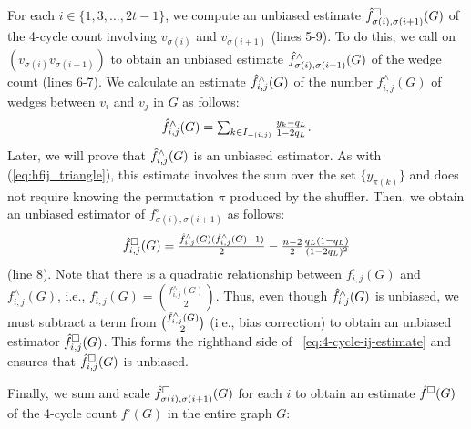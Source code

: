 For each $i \in \{1, 3, \ldots, 2t-1\}$, we compute an unbiased estimate $\hat{f}_{\sigma(i),
\sigma(i+1)}^\square(G)$ of the 4-cycle count involving $v_{\sigma(i)}$ and $v_{\sigma(i+1)}$ (lines 5-9). 
To do this, 
we call \AlgWS{} on
$(v_{\sigma(i)} v_{\sigma(i+1)})$ to obtain an unbiased estimate $\hat{f}_{\sigma(i),
\sigma(i+1)}^\wedge(G)$ of the wedge count (lines 6-7). 
We calculate an estimate $\hat{f}_{i,j}^\wedge(G)$ of the number $f_{i,j}^\wedge(G)$ of wedges between $v_i$ and $v_j$ in $G$ as follows:
\begin{equation}\label{eq:wedge-estimate}
  \textstyle{\hat{f}^\wedge_{i,j}(G) = \sum_{k \in I_{-(i,j)}} \frac{y_k - q_L}{1-2q_L}.}
\end{equation}
Later, we will prove that $\hat{f}^\wedge_{i,j}(G)$ is an unbiased estimator. 
As with (\ref{eq:hfij_triangle}), this estimate involves the sum over the set $\{y_{\pi(k)}\}$ and does not require knowing the permutation $\pi$ produced by the shuffler. 
Then, we obtain an unbiased estimator of $f_{\sigma(i), \sigma(i+1)}^\square$ as follows:
\begin{equation}\label{eq:4-cycle-ij-estimate}
  \textstyle{\hat{f}_{i,j}^\square(G) = \frac{\hat{f}^\wedge_{i, j}(G)(\hat{f}^\wedge_{i, j}(G)-1)}{2} - \frac{n-2}{2}\frac{q_L(1-q_L)}{(1-2q_L)^2}}
\end{equation}
(line 8). 
Note that 
there is a quadratic relationship between $f_{i, j}^\square(G)$ and $f_{i, j}^\wedge(G)$, i.e., $f_{i, j}^\square(G) = \binom{f_{i, j}^\wedge(G)}{2}$. 
Thus, 
even though $\hat{f}_{i, j}^\wedge(G)$ is unbiased, 
we must subtract a term from $\binom{\hat{f}_{i, j}^\wedge(G)}{2}$ (i.e., bias correction) to obtain an unbiased estimator $\hat{f}_{i, j}^\square(G)$. 
This forms the righthand side of
~\eqref{eq:4-cycle-ij-estimate} and ensures that $\hat{f}_{i,j}^\square(G)$ is unbiased. 

Finally, 
we sum and scale 
$\hat{f}_{\sigma(i), \sigma(i+1)}^\square(G)$ for each $i$ to obtain an estimate $\hat{f}^\square(G)$ of the 4-cycle count $f^\square(G)$ in the entire graph $G$: 

